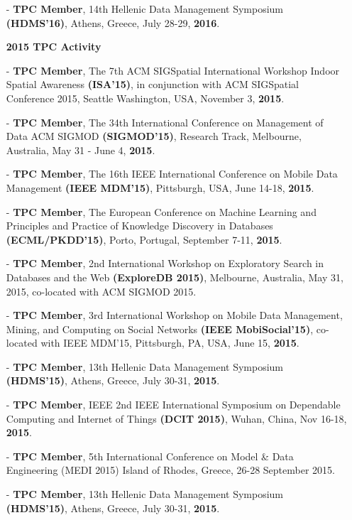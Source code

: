 \documentclass[10pt]{article}
\begin{document}
\begin{itemize}
\begin{itemize}
\item[-] {\bf TPC Member}, 14th Hellenic Data Management Symposium {\bf (HDMS'16)}, Athens, Greece, July 28-29, {\bf 2016}.
%
\vspace{0.1in}
\item[]{\bf 2015 TPC Activity\hrulefill }
%
\item[-] {\bf TPC Member}, The 7th ACM SIGSpatial International Workshop Indoor Spatial Awareness {\bf (ISA'15)}, in conjunction with ACM SIGSpatial Conference 2015, Seattle Washington, USA, November 3, {\bf 2015}.
\item[-] {\bf TPC Member}, The 34th International Conference on Management of Data ACM SIGMOD {\bf (SIGMOD'15)}, Research Track, Melbourne, Australia, May 31 - June 4, {\bf 2015}.
\item[-] {\bf TPC Member}, The 16th IEEE International Conference on Mobile Data Management {\bf (IEEE MDM'15)}, Pittsburgh, USA, June 14-18, {\bf 2015}.
\item[-] {\bf TPC Member}, The European Conference on Machine Learning and Principles and Practice of Knowledge Discovery in Databases {\bf (ECML/PKDD'15)}, Porto, Portugal, September 7-11, {\bf 2015}.
\item[-] {\bf TPC Member}, 2nd International Workshop on Exploratory Search in Databases and the Web {\bf (ExploreDB 2015)}, Melbourne, Australia, May 31, 2015, co-located with ACM SIGMOD 2015.
\item[-] {\bf TPC Member}, 3rd International Workshop on Mobile Data Management, Mining, and Computing on Social Networks {\bf (IEEE MobiSocial'15)}, co-located with IEEE MDM'15, Pittsburgh, PA, USA, June 15, {\bf 2015}.
\item[-] {\bf TPC Member}, 13th Hellenic Data Management Symposium {\bf (HDMS'15)}, Athens, Greece, July 30-31, {\bf 2015}.
\item[-] {\bf TPC Member}, IEEE 2nd IEEE International Symposium on Dependable Computing and Internet of Things {\bf (DCIT 2015)}, Wuhan, China, Nov 16-18, {\bf 2015}.
\item[-] {\bf TPC Member}, 5th International Conference on Model \& Data Engineering (MEDI 2015) Island of Rhodes, Greece, 26-28 September 2015.
\item[-] {\bf TPC Member}, 13th Hellenic Data Management Symposium {\bf (HDMS'15)}, Athens, Greece, July 30-31, {\bf 2015}.


\end{itemize}
\end{itemize}
\end{document}
